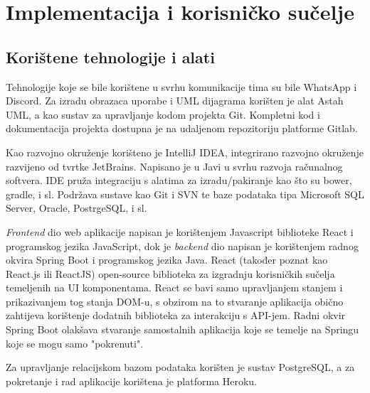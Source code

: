 \chapter{Implementacija i korisničko sučelje}
		
		
		\section{Korištene tehnologije i alati}
		
%			
			
			Tehnologije koje se bile korištene u svrhu komunikacije tima su bile WhatsApp i Discord. Za izradu obrazaca uporabe i UML dijagrama korišten je alat Astah UML, a kao sustav za upravljanje kodom projekta Git. Kompletni kod i dokumentacija projekta dostupna je na udaljenom repozitoriju platforme Gitlab.
			
			Kao razvojno okruženje korišteno je IntelliJ IDEA, integrirano razvojno okruženje razvijeno od tvrtke JetBrains. Napisano je u Javi u svrhu razvoja računalnog softvera. IDE pruža integraciju s alatima za izradu/pakiranje kao što su bower, gradle, i sl. Podržava sustave kao Git i SVN te baze podataka tipa Microsoft SQL Server, Oracle, PostrgeSQL, i sl.
			
			\textit{Frontend} dio web aplikacije napisan je korištenjem Javascript biblioteke React i programskog jezika JavaScript, dok je \textit{backend} dio napisan je korištenjem radnog okvira Spring Boot i programskog jezika Java. React (također poznat kao React.js ili ReactJS) open-source biblioteka za izgradnju korisničkih sučelja temeljenih na UI komponentama. React se bavi samo upravljanjem stanjem i prikazivanjem tog stanja DOM-u, s obzirom na to stvaranje aplikacija obično zahtijeva korištenje dodatnih biblioteka za interakciju s API-jem. Radni okvir Spring Boot olakšava stvaranje samostalnih aplikacija koje se temelje na Springu koje se mogu samo "pokrenuti".
			
			Za upravljanje relacijskom bazom podataka korišten je sustav PostgreSQL, a za pokretanje i rad aplikacije korištena je platforma Heroku.
			
			\eject 
		
